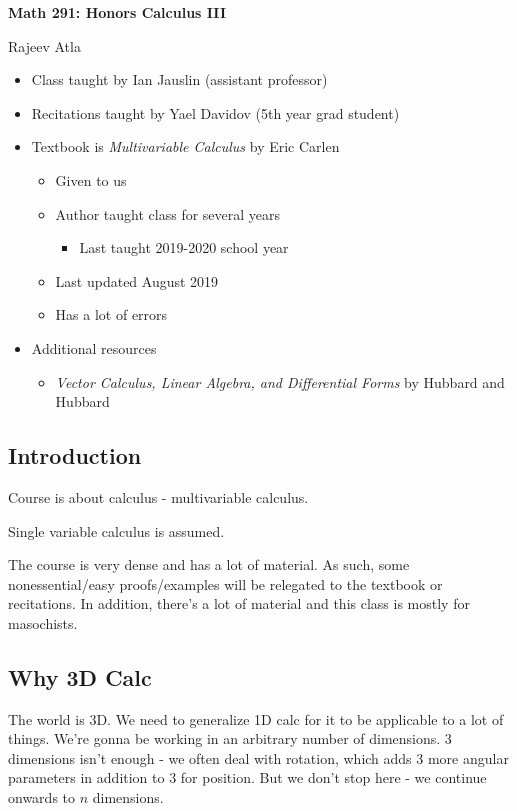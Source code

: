 \documentclass[11pt]{article}
\begin{document}
\begin{center}
    \Large \textbf{Math 291: Honors Calculus III}
\end{center}
\begin{center}
    \Large Rajeev Atla
\end{center}

\begin{itemize}
\item Class taught by Ian Jauslin (assistant professor)
\item Recitations taught by Yael Davidov (5th year grad student)
\item Textbook is \emph{Multivariable Calculus} by Eric Carlen \cite{carlen}
  \begin{itemize}
  \item Given to us
  \item Author taught class for several years
    \begin{itemize}
    \item Last taught 2019-2020 school year
    \end{itemize}
  \item Last updated August 2019
  \item Has a lot of errors
  \end{itemize}
\item Additional resources
  \begin{itemize}
  \item \emph{Vector Calculus, Linear Algebra, and Differential Forms} by Hubbard and Hubbard \cite{hubbard}
  \end{itemize}
\end{itemize}

\newpage

\doublespacing
\tableofcontents
\singlespacing


\subsection{Introduction}
Course is about calculus - multivariable calculus.

Single variable calculus is assumed.

The course is very dense and has a lot of material.
As such, some nonessential/easy proofs/examples will be relegated to the textbook or recitations.
In addition, there's a lot of material and this class is mostly for masochists.

\subsection{Why 3D Calc}
The world is 3D.
We need to generalize 1D calc for it to be applicable to a lot of things.
We're gonna be working in an arbitrary number of dimensions.
3 dimensions isn't enough - we often deal with rotation, which adds 3 more angular parameters in addition to 3 for position.
But we don't stop here - we continue onwards to $n$ dimensions.
\end{document}
